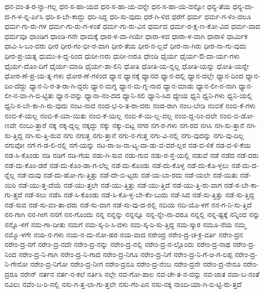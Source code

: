 {ಧನ-ವಂ-ತ-ರ-ನ್ನಾ-ಗಲ್ಲ
ಧನ-ಸ-ಹಾ-ಯದ
ಧನ-ಸ-ಹಾ-ಯ-ವನ್ನೇ
ಧನ-ಸ-ಹಾ-ಯ-ವನ್ನೋ
ಧನ್ಯ-ತೆಯ
ಧನ್ಯ-ವಾ-ದ-ಗ-ಳ-ನ್ನ-ರ್ಪಿಸಿ
ಧರಿ-ಸ-ಬೇ-ಕಾದ್ದು
ಧರಿ-ಸಿದ್ದ
ಧರಿ-ಸು-ವುದು
ಧರೆ-ಗಿ-ಳಿದ
ಧರೆಗೆ
ಧರ್ಮ
ಧರ್ಮ-ಗ-ಳಿಂ-ದಲೂ
ಧರ್ಮ-ಗು-ರು-ಗಳ
ಧರ್ಮ-ಗು-ರು-ಗ-ಳಂತೆ
ಧರ್ಮ-ಗು-ರು-ವಿನ
ಧರ್ಮದ
ಧರ್ಮ-ರ-ಕ್ಷ-ಣ-ಕೋ-ವಿದ
ಧರ್ಮ-ವಾದ
ಧರ್ಮವೂ
ಧಾಂಡಿಗ
ಧಾಂಡಿ-ಗನೇ
ಧಾಮಕ್ಕೆ
ಧಾರ-ಳ-ವಾ-ಗಿಯೇ
ಧಾರಾ-ಳದ
ಧಾರಾ-ಳ-ವಾಗಿ
ಧಾರಾಳಿ
ಧಾರ್ಮಿಕ
ಧಾವಿ-ಸಿ-ಬಂ-ದರು
ಧೀರ
ಧೀರ-ಗಂ-ಭೀ-ರ-ವಾಗಿ
ಧೀರ-ತೆಯ
ಧೀರ-ನ-ಲ್ಲವೆ
ಧೀರ-ನಾ-ಗಿರು
ಧೀರ-ನಾ-ಗು-ವುದು
ಧೀರ-ಪ್ರ-ಯತ್ನ
ಧುಮು-ಕಿ-ದ್ದ-ರಿಂದ
ಧುರೀ-ಣರು
ಧುರೀ-ಣರೂ
ಧೇಂಡಿ
ಧೈರ್ಯ
ಧೈರ್ಯ-ಔ-ದಾ-ರ್ಯ-ಗಳು
ಧೈರ್ಯ-ದೊಂ-ದಿಗೆ
ಧೈರ್ಯ-ಮಾಡಿ
ಧೈರ್ಯ-ಶಾ-ಲಿನಿ
ಧೋತಿ
ಧೋತಿ-ಯ-ನ್ನಲ್ಲ
ಧೋತಿ-ಯನ್ನು
ಧೋತಿ-ಯನ್ನೇ
ಧೋರ-ಣೆ-ಪ್ರ-ಯ-ತ್ನ-ಗಳು
ಧೋರ-ಣೆ-ಗಳಿಂದ
ಧ್ಯಾನ
ಧ್ಯಾನಕ್ಕೆ
ಧ್ಯಾನದ
ಧ್ಯಾನ-ದಲ್ಲಿ
ಧ್ಯಾನ-ದಲ್ಲೇ
ಧ್ಯಾನ-ದಿಂದ
ಧ್ಯಾನ-ದಿಂ-ದೆದ್ದು
ಧ್ಯಾನ-ನಿ-ರ-ತ-ರಾ-ಗಿ-ದ್ದರು
ಧ್ಯಾನ-ಮಗ್ನ
ಧ್ಯಾನ-ಮ-ಗ್ನ-ನಾದ
ಧ್ಯಾನ-ಮಾಡು
ಧ್ಯಾನ-ಲೀ-ನ-ನಾಗಿ
ಧ್ಯಾನ-ಲೀ-ನ-ವಾ-ಗಿ-ಬಿ-ಟ್ಟಿತು
ಧ್ಯಾನ-ವನ್ನು
ಧ್ಯಾನಾ-ನಂ-ದದ
ಧ್ಯಾನಿ-ಸಲಿ
ಧ್ಯಾನಿ-ಸಿದ
ಧ್ಯೇಯ
ಧ್ವನಿ
ಧ್ವನಿ-ಗಳು
ಧ್ವನಿ-ಯಲ್ಲಿ
ಧ್ವನಿ-ಸ-ಬೇ-ಕಾ-ಗಿ-ರು-ವುದು
ನಂಟ-ನಾದ
ನಂದ-ಭ-ರಿ-ತ-ರಾ-ದರು
ನಂದ-ರಾಗಿ
ನಂಬ-ಬೇಡಿ
ನಂಬಿಕೆ
ನಂಬಿ-ಕೆ-ಗಳು
ನಂಬಿ-ಕೆ-ಯಲ್ಲ
ನಂಬಿ-ಕೆ-ಯಾ-ಯಿತು
ನಂಬಿ-ಕೆ-ಯಿಲ್ಲ
ನಂಬಿ-ಕೆ-ಯಿ-ಲ್ಲ-ವಲ್ಲ
ನಂಬಿ-ದ್ದ-ರಿಂ-ದಲೇ
ನಂಬಿ-ಬಿ-ಡೋ-ಣವೇ
ನಂಬು-ತ್ತಾರೆ
ನಕ್ಕ
ನಕ್ಕ-ದ್ದಲ್ಲ
ನಕ್ಕದ್ದು
ನಕ್ಕು
ನಕ್ಕು-ಬಿಟ್ಟ
ನಗರ
ನಗ-ರ-ಗಳು
ನಗ-ರದ
ನಗಿಸಿ
ನಗಿ-ಸು-ತ್ತಾನೆ
ನಗಿ-ಸು-ತ್ತಿದ್ದ
ನಗಿ-ಸು-ತ್ತಿ-ರುವ
ನಗು
ನಗುತ್ತ
ನಗು-ತ್ತಾನೆ
ನಗು-ನ-ಗುತ್ತ
ನಗು-ವಿ-ನಲ್ಲಿ
ನಗು-ವುದನ್ನು
ನಗು-ವು-ದಿಲ್ಲ
ನಗುವೋ
ನಗೆ-ಗ-ಡ-ಲಿ-ನಲ್ಲಿ
ನಗೆ-ಯನ್ನು
ನಟ-ರಾ-ಜ-ನಾ-ಟ್ಯ-ವಾ-ಡು-ವ-ವರೆ-ಲ್ಲರ
ನಡ-ವ-ಳಿಕೆ
ನಡ-ವ-ಳಿ-ಕೆಯ
ನಡ-ಸಿ-ಕೊಂಡು
ನಡಿ
ನಡಿಗೆ
ನಡಿ-ಗೆಯ
ನಡು-ಗಿ-ಸುವ
ನಡು-ಗುವ
ನಡು-ರ-ಸ್ತೆ-ಯಲ್ಲಿ
ನಡುವೆ
ನಡೆ
ನಡೆದ
ನಡೆ-ದರು
ನಡೆ-ದು-ಕೊಂ-ಡರೆ
ನಡೆ-ದು-ಕೊಂ-ಡಾ-ಗ-ಲೆಲ್ಲ
ನಡೆ-ದು-ಕೊಂಡು
ನಡೆ-ದು-ಕೊಳ್ಳ
ನಡೆ-ದು-ಕೊ-ಳ್ಳಲು
ನಡೆ-ದು-ದ-ನ್ನೆಲ್ಲ
ನಡೆ-ದುವು
ನಡೆ-ದು-ಹೋ-ಗು-ತ್ತಿತ್ತು
ನಡೆ-ದೇ-ಬಿ-ಟ್ಟರು
ನಡೆ-ಯ-ಬಾ-ರದು
ನಡೆ-ಯಲೇ
ನಡೆ-ಯಿತು
ನಡೆ-ಯಿರಿ
ನಡೆ-ಯು-ತ್ತ-ದೆಯೆ
ನಡೆ-ಯು-ತ್ತಲೇ
ನಡೆ-ಯು-ತ್ತಿತ್ತು
ನಡೆ-ಯು-ತ್ತಿದೆ
ನಡೆ-ಯು-ತ್ತಿ-ರು-ವಾಗ
ನಡೆ-ಸ-ಬೇ-ಕಾ-ಗು-ತ್ತದೆ
ನಡೆ-ಸಲು
ನಡೆಸಿ
ನಡೆ-ಸಿ-ಕೊಂಡು
ನಡೆ-ಸಿ-ಕೊ-ಳ್ಳ-ಬೇ-ಕೆಂ-ಬುದು
ನಡೆ-ಸಿದ
ನಡೆ-ಸು-ತ್ತಿತ್ತು
ನಡೆ-ಸು-ತ್ತಿದ್ದ
ನಡೆ-ಸುವ
ನಡೆ-ಸು-ವಂ-ತಾ-ದರು
ನಡೆ-ಸು-ವಾಗ
ನಡೆ-ಸು-ವು-ದ-ರಲ್ಲಿ
ನದಿಯ
ನದಿ-ಯೊ-ಳಗೆ
ನನ-ಗ-ನಿ-ಸು-ತ್ತಿದೆ
ನನ-ಗಾಗಿ
ನನ-ಗೀಗ
ನನಗೆ
ನನ-ಗೊಂದು
ನನ್ನ
ನನ್ನನ್ನು
ನನ್ನನ್ನೂ
ನನ್ನ-ನ್ನೇ-ನಾ-ದರೂ
ನನ್ನಲ್ಲಿ
ನನ್ನ-ಷ್ಟಕ್ಕೆ
ನನ್ನಿಂದ
ನನ್ನು
ನನ್ನೊ-ಳಗೆ
ನಮ-ಗಾ-ದೀತು
ನಮಗೆ
ನಮ-ಸ್ಕ-ರಿ-ಸಿ-ದಳು
ನಮ-ಸ್ಕ-ರಿ-ಸು-ತ್ತಿದ್ದ
ನಮ-ಸ್ಕಾರ
ನಮೂ-ನೆಯ
ನಮ್ಮ
ನಮ್ಮೊ-ಳಗೇ
ನಯ-ನ-ಗಳು
ನಯ-ನ-ಮ-ನೋ-ಹರ
ನಯ-ವಾದ
ನರೇಂದ್ರ
ನರೇಂ-ದ್ರ-ಚ-ಕ್ರ-ವರ್ತಿ
ನರೇಂ-ದ್ರನ
ನರೇಂ-ದ್ರ-ನಗೆ
ನರೇಂ-ದ್ರ-ನದೇ
ನರೇಂ-ದ್ರ-ನನ್ನು
ನರೇಂ-ದ್ರ-ನಲ್ಲಿ
ನರೇಂ-ದ್ರ-ನ-ಲ್ಲೊಂದು
ನರೇಂ-ದ್ರ-ನಾಥ
ನರೇಂ-ದ್ರ-ನಿಂದ
ನರೇಂ-ದ್ರ-ನಿ-ಗಾಗಿ
ನರೇಂ-ದ್ರ-ನಿ-ಗಾದ
ನರೇಂ-ದ್ರ-ನಿಗೂ
ನರೇಂ-ದ್ರ-ನಿಗೆ
ನರೇಂ-ದ್ರ-ನಿ-ಗೆ-ಆ-ಗ-ಲಪ್ಪ
ನರೇಂ-ದ್ರ-ನಿ-ಗೇನೋ
ನರೇಂ-ದ್ರ-ನಿಗೋ
ನರೇಂ-ದ್ರ-ನೀಗ
ನರೇಂ-ದ್ರನೂ
ನರೇಂ-ದ್ರ-ನೆಂಬ
ನರೇಂ-ದ್ರನೇ
ನರೇಂ-ದ್ರ-ನೇನೂ
ನರೇಂ-ದ್ರರೂ
ನರೇನ್
ನರ್ತನ
ನರ್ತ-ನ-ಕಲೆ
ನರ್ತಿಸಿ
ನಲ್ಲೇ
ನವ-ಗೋ-ಪಾಲ
ನವ-ಚೇ-ತ-ನ-ವನ್ನು
ನವ-ಜಾತ
ನವಾ-ಬ-ನಂತೆ
ನವಿಲು
ನವೆಂ-ಬ-ರಿ-ನಲ್ಲಿ
ನಸು-ಗ-ತ್ತ-ಲಾ-ಗು-ತ್ತಲೇ
ನಸು-ಗೆಂ-ಪಿನ
ನಸು-ನಕ್ಕ
ನಾಂದಿ-ಯಾ-ಗಿ-ಬಿ-ಟ್ಟಿ-ರು-ತ್ತದೆ
}
